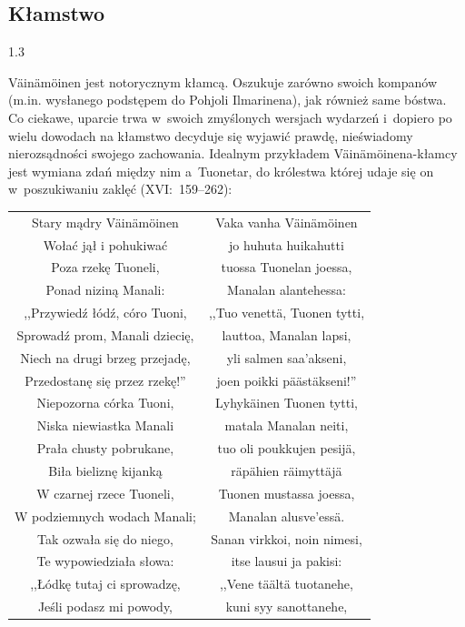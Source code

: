 \documentclass[11pt,a4paper,twoside]{report}
\begin{document}
\subsection*{Kłamstwo}
\begin{spacing}{1.3}

Väinämöinen jest notorycznym kłamcą. Oszukuje zarówno swoich kompanów (m.in. wysłanego podstępem do Pohjoli Ilmarinena), jak również same bóstwa. Co ciekawe, uparcie trwa w~swoich zmyślonych wersjach wydarzeń i~dopiero po wielu dowodach na kłamstwo decyduje się wyjawić prawdę, nieświadomy nierozsądności swojego zachowania. Idealnym przykładem Väinämöinena-kłamcy jest wymiana zdań między nim a~Tuonetar, do królestwa której udaje się on w~poszukiwaniu zaklęć (XVI:~159--262):
\end{spacing}
{\centering
\small
\begin{longtable}{c c}
Stary mądry Väinämöinen		&  Vaka vanha Väinämöinen \\
Wołać jął i pohukiwać		&  jo huhuta huikahutti \\
Poza rzekę Tuoneli, 		&  tuossa Tuonelan joessa, \\
Ponad niziną Manali: 		&  Manalan alantehessa: \\
,,Przywiedź łódź, córo Tuoni, 		&  ,,Tuo venettä, Tuonen tytti, \\
Sprowadź prom, Manali dziecię, 		&  lauttoa, Manalan lapsi, \\
Niech na drugi brzeg przejadę, 		&  yli salmen saa'akseni, \\
Przedostanę się przez rzekę!'' 		&  joen poikki päästäkseni!'' \\
Niepozorna córka Tuoni, 		&  Lyhykäinen Tuonen tytti, \\
Niska niewiastka Manali			&  matala Manalan neiti, \\
Prała chusty pobrukane, 		&  tuo oli poukkujen pesijä, \\
Biła bieliznę kijanką			&  räpähien räimyttäjä \\
W czarnej rzece Tuoneli, 		&  Tuonen mustassa joessa, \\
W podziemnych wodach Manali; 		&  Manalan alusve'essä. \\
Tak ozwała się do niego, 			&  Sanan virkkoi, noin nimesi, \\
Te wypowiedziała słowa: 		&  itse lausui ja pakisi: \\
,,Łódkę tutaj ci sprowadzę, 		&  ,,Vene täältä tuotanehe, \\
Jeśli podasz mi powody, 			&  kuni syy sanottanehe, \\

\end{longtable}}
\end{document}
